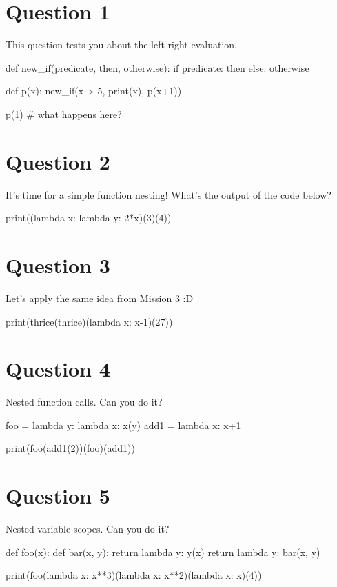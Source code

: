 \section{Question 1}
This question tests you about the left-right evaluation.
\begin{python}
def new_if(predicate, then, otherwise):
    if predicate:
        then
    else:
        otherwise

def p(x):
    new_if(x > 5, print(x), p(x+1))

p(1) # what happens here?
\end{python}

\newpage

\section{Question 2}
It's time for a simple function nesting! What's the output of the code below?
\begin{python}
print((lambda x: lambda y: 2*x)(3)(4))
\end{python}

\section{Question 3}
Let's apply the same idea from Mission 3 :D
\begin{python}
print(thrice(thrice)(lambda x: x-1)(27))
\end{python}

\section{Question 4}
Nested function calls. Can you do it?
\begin{python}
foo = lambda y: lambda x: x(y)
add1 = lambda x: x+1

print(foo(add1(2))(foo)(add1))
\end{python}

\section{Question 5}
Nested variable scopes. Can you do it?
\begin{python}
def foo(x):
    def bar(x, y):
        return lambda y: y(x)
    return lambda y: bar(x, y)

print(foo(lambda x: x**3)(lambda x: x**2)(lambda x: x)(4))
\end{python}

